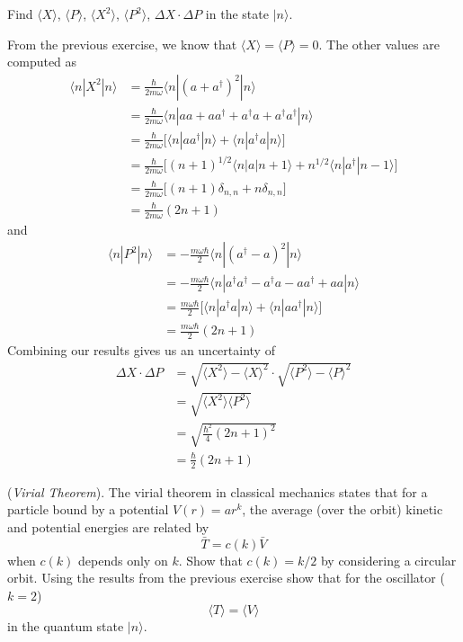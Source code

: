\documentclass[../principles-of-quantum-mechanics.tex]{subfiles}
\begin{document}
\begin{questions}
		\question Find $\langle X\rangle$, $\langle P\rangle$, $\langle X^2\rangle$, $\langle P^2\rangle$, $\Delta X \cdot \Delta P$ in the state $|n\rangle$.
		\begin{solution}
			From the previous exercise, we know that $\langle X\rangle = \langle P \rangle = 0$. The other values are computed as
			\begin{align*}
				\langle n|X^2|n\rangle &= \frac{\hbar}{2m\omega}\langle n|(a + a^\dagger)^2|n\rangle \\
				&= \frac{\hbar}{2m\omega}\langle n|aa + aa^\dagger + a^\dagger a + a^\dagger a^\dagger|n\rangle \\
				&= \frac{\hbar}{2m\omega}\Big[\langle n|aa^\dagger |n\rangle + \langle n|a^\dagger a|n\rangle\Big] \\
				&= \frac{\hbar}{2m\omega}\Big[(n+1)^{1/2}\langle n|a|n + 1\rangle + n^{1/2}\langle n|a^\dagger|n - 1\rangle\Big] \\
				&= \frac{\hbar}{2m\omega}\Big[(n + 1)\delta_{n,n} + n\delta_{n, n}\Big] \\
				&= \frac{\hbar}{2m\omega}(2n + 1)
			\end{align*}
			and
			\begin{align*}
				\langle n|P^2|n\rangle &= -\frac{m\omega\hbar}{2}\langle n|(a^\dagger - a)^2|n\rangle \\
				&= -\frac{m\omega\hbar}{2}\langle n|a^\dagger a^\dagger - a^\dagger a - aa^\dagger + aa|n\rangle \\
				&= \frac{m\omega\hbar}{2}\Big[\langle n|a^\dagger a|n\rangle + \langle n|aa^\dagger|n\rangle\Big] \\
				&= \frac{m\omega\hbar}{2}(2n + 1)
			\end{align*}
			Combining our results gives us an uncertainty of
			\begin{align*}
				\Delta X \cdot \Delta P &= \sqrt{\langle X^2\rangle - \langle X\rangle^2}\cdot\sqrt{\langle P^2\rangle - \langle P\rangle ^2} \\
				&= \sqrt{\langle X^2\rangle\langle P^2\rangle} \\
				&= \sqrt{\frac{\hbar^2}{4}(2n + 1)^2} \\
				&= \frac{\hbar}{2}(2n + 1)
			\end{align*}
		\end{solution}
		
		\question (\textit{Virial Theorem}). The virial theorem in classical mechanics states that for a particle bound by a potential $V(r) = ar^k$, the average (over the orbit) kinetic and potential energies are related by
		$$\bar{T} = c(k)\bar{V}$$
		when $c(k)$ depends only on $k$. Show that $c(k) = k/2$ by considering a circular orbit. Using the results from the previous exercise show that for the oscillator ($k=2$)
		$$\langle T\rangle = \langle V\rangle$$
		in the quantum state $|n\rangle$.
		

\end{questions}
\end{document}

